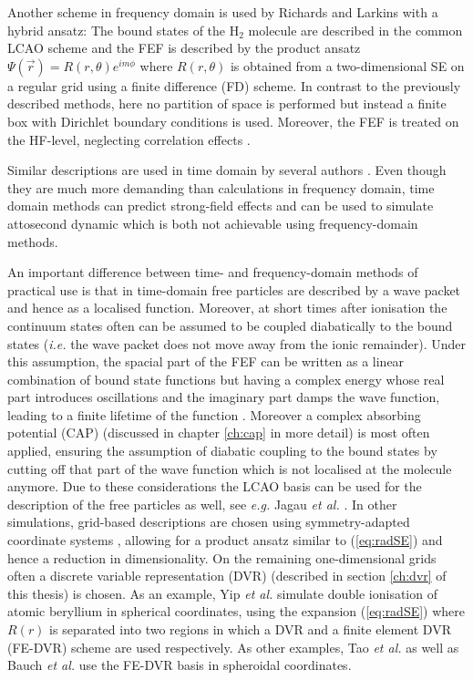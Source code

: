 Another scheme in frequency domain is used by Richards and Larkins \cite{richardsFD} with a hybrid ansatz: The bound states of the H$_2$ molecule are described in the common LCAO scheme and the FEF is described by the product ansatz $\Psi(\vec{r}) = R(r,\theta) e^{im\phi}$ where $R(r,\theta)$ is obtained from a two-dimensional SE on a regular grid using a finite difference (FD) scheme.
In contrast to the previously described methods, here no partition of space is performed but instead a finite box with Dirichlet boundary conditions is used.
Moreover, the FEF is treated on the HF-level, neglecting correlation effects \cite{richardsFD}.

Similar descriptions are used in time domain by several authors \cite{CAPccEOM, bauch1, taoDVR}.
Even though they are much more demanding than calculations in frequency domain, time domain methods can predict strong-field effects and can be used to simulate attosecond dynamic which is both not achievable using frequency-domain methods.

An important difference between time- and frequency-domain methods of practical use is that in time-domain free particles are described by a wave packet and hence as a localised function.
Moreover, at short times after ionisation the continuum states often can be assumed to be coupled diabatically to the bound states (\textit{i.e.} the wave packet does not move away from the ionic remainder).
Under this assumption, the spacial part of the FEF can be written as a linear combination of bound state functions but having a complex energy whose real part introduces oscillations and the imaginary part damps the wave function, leading to a finite lifetime of the function \cite{CAPccEOM}.
Moreover a complex absorbing potential (CAP) (discussed in chapter \ref{ch:cap} in more detail) is most often applied, ensuring the assumption of diabatic coupling to the bound states by cutting off that part of the wave function which is not localised at the molecule anymore.
Due to these considerations the LCAO basis can be used for the description of the free particles as well, see \textit{e.g.} Jagau \textit{et al.} \cite{CAPccEOM}.
In other simulations, grid-based descriptions are chosen using symmetry-adapted coordinate systems \cite{radau,jacobi, hyperspheric,taoDVR}, allowing for a product ansatz similar to (\ref{eq:radSE}) and hence a reduction in dimensionality.
On the remaining one-dimensional grids often a discrete variable representation (DVR) (described in section \ref{ch:dvr} of this thesis) is chosen.
As an example, Yip \textit{et al.} \cite{yipDVR} simulate double ionisation of atomic beryllium in spherical coordinates, using the expansion (\ref{eq:radSE}) where $R(r)$ is separated into two regions in which a DVR and a finite element DVR (FE-DVR) scheme are used respectively.
As other examples, Tao \textit{et al.} \cite{taoDVR} as well as Bauch \textit{et al.} \cite{bauch1, bauch2} use the FE-DVR basis in spheroidal coordinates.

